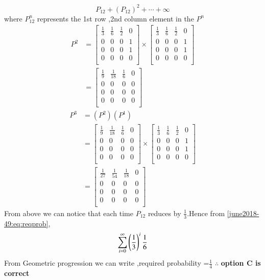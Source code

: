 \begin{equation}
    P_{12}+(P_{12})^{2}+\cdots+\infty \label{june2018-49:eq:reqprob}
\end{equation}
where $P_{12}^{n}$ represents the 1st row ,2nd column element in the $P^{n}$
\begin{align}
P^2&=\begin{bmatrix}
\frac{1}{3}&\frac{1}{6}&\frac{1}{2}&0\\
0&0&0&1\\
0&0&0&1\\
0&0&0&0\\
\end{bmatrix} \times
\begin{bmatrix}
\frac{1}{3}&\frac{1}{6}&\frac{1}{2}&0\\
0&0&0&1\\
0&0&0&1\\
0&0&0&0\\
\end{bmatrix}\\
&=\begin{bmatrix}
\frac{1}{9}&\frac{1}{18}&\frac{1}{6}&0\\
0&0&0&0\\
0&0&0&0\\
0&0&0&0\\
\end{bmatrix}
\end{align}
\begin{align}
    P^3&=(P^2)(P^1)\\
    &=\begin{bmatrix}
\frac{1}{9}&\frac{1}{18}&\frac{1}{6}&0\\
0&0&0&0\\
0&0&0&0\\
0&0&0&0\\
\end{bmatrix}\times
\begin{bmatrix}
\frac{1}{3}&\frac{1}{6}&\frac{1}{2}&0\\
0&0&0&1\\
0&0&0&1\\
0&0&0&0\\
\end{bmatrix}\\
&=\begin{bmatrix}
\frac{1}{27}&\frac{1}{54}&\frac{1}{18}&0\\
0&0&0&0\\
0&0&0&0\\
0&0&0&0\\
\end{bmatrix}
\end{align}
From above we can notice that each time $P_{12}$ reduces by $\frac{1}{3}$.Hence from \eqref{june2018-49:eq:reqprob},
\begin{equation}
    \sum_{i=0}^{\infty}\left(\frac{1}{3}\right)^i \frac{1}{6}
\end{equation}
From Geometric progression we can write ,required probability =$\frac{1}{4}$
$\therefore$ \textbf{option C is correct}